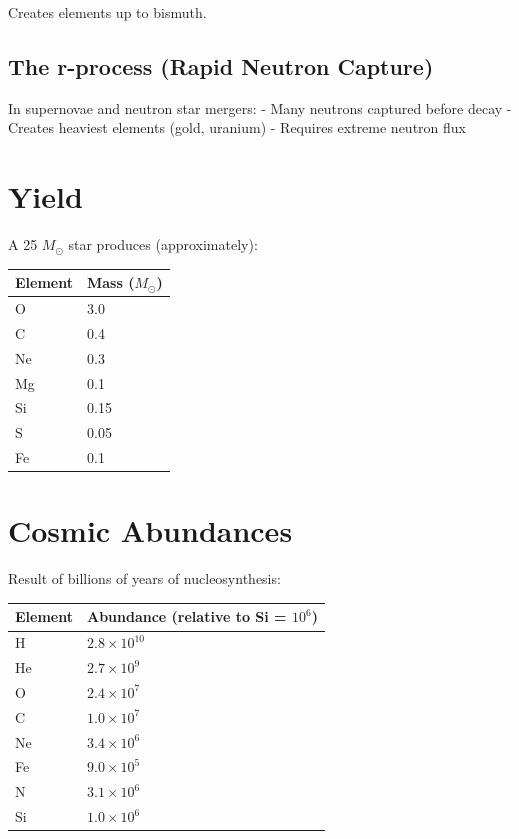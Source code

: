 \documentclass[
  11pt,
  letterpaper,
  twoside,
  openright]{book}
\begin{document}
Creates elements up to bismuth.

\subsection{The r-process (Rapid Neutron
Capture)}\label{the-r-process-rapid-neutron-capture}

In supernovae and neutron star mergers: - Many neutrons captured before
decay - Creates heaviest elements (gold, uranium) - Requires extreme
neutron flux

\section{Yield}\label{yield}

A 25 \(M_\odot\) star produces (approximately):

\begin{longtable}[]{@{}ll@{}}
\toprule\noalign{}
Element & Mass (\(M_\odot\)) \\
\midrule\noalign{}
\endhead
\bottomrule\noalign{}
\endlastfoot
O & 3.0 \\
C & 0.4 \\
Ne & 0.3 \\
Mg & 0.1 \\
Si & 0.15 \\
S & 0.05 \\
Fe & 0.1 \\
\end{longtable}

\section{Cosmic Abundances}\label{cosmic-abundances}

Result of billions of years of nucleosynthesis:

\begin{longtable}[]{@{}ll@{}}
\toprule\noalign{}
Element & Abundance (relative to Si = \(10^6\)) \\
\midrule\noalign{}
\endhead
\bottomrule\noalign{}
\endlastfoot
H & \(2.8 \times 10^{10}\) \\
He & \(2.7 \times 10^9\) \\
O & \(2.4 \times 10^7\) \\
C & \(1.0 \times 10^7\) \\
Ne & \(3.4 \times 10^6\) \\
Fe & \(9.0 \times 10^5\) \\
N & \(3.1 \times 10^6\) \\
Si & \(1.0 \times 10^6\) \\
\end{longtable}
\end{document}

